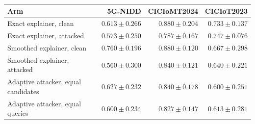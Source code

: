 \begin{tabular}{lrrr}
\toprule
\textbf{Arm} & \textbf{5G-NIDD} & \textbf{CICIoMT2024} & \textbf{CICIoT2023} \\
\midrule
Exact explainer, clean & $0.613 \pm 0.266$ & $0.880 \pm 0.204$ & $0.733 \pm 0.137$ \\
Exact explainer, attacked & $0.573 \pm 0.250$ & $0.787 \pm 0.167$ & $0.747 \pm 0.076$ \\
\addlinespace
Smoothed explainer, clean & $0.760 \pm 0.196$ & $0.880 \pm 0.120$ & $0.667 \pm 0.298$ \\
Smoothed explainer, attacked & $0.560 \pm 0.300$ & $0.840 \pm 0.121$ & $0.640 \pm 0.221$ \\
\addlinespace
Adaptive attacker, equal candidates & $0.627 \pm 0.232$ & $0.840 \pm 0.178$ & $0.600 \pm 0.251$ \\
Adaptive attacker, equal queries & $0.600 \pm 0.234$ & $0.827 \pm 0.147$ & $0.613 \pm 0.281$ \\
\bottomrule
\end{tabular}
